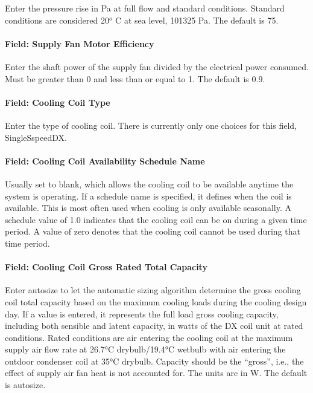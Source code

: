 Enter the pressure rise in Pa at full flow and standard conditions. Standard conditions are considered 20\(^{o}\) C at sea level, 101325 Pa. The default is 75.

\paragraph{Field: Supply Fan Motor Efficiency}\label{field-supply-fan-motor-efficiency-2}

Enter the shaft power of the supply fan divided by the electrical power consumed. Must be greater than 0 and less than or equal to 1. The default is 0.9.

\paragraph{Field: Cooling Coil Type}\label{field-cooling-coil-type-2}

Enter the type of cooling coil. There is currently only one choices for this field, SingleSspeedDX.

\paragraph{Field: Cooling Coil Availability Schedule Name}\label{field-cooling-coil-availability-schedule-name-2}

Usually set to blank, which allows the cooling coil to be available anytime the system is operating. If a schedule name is specified, it defines when the coil is available. This is most often used when cooling is only available seasonally. A schedule value of 1.0 indicates that the cooling coil can be on during a given time period. A value of zero denotes that the cooling coil cannot be used during that time period.

\paragraph{Field: Cooling Coil Gross Rated Total Capacity}\label{field-cooling-coil-gross-rated-total-capacity-1}

Enter autosize to let the automatic sizing algorithm determine the gross cooling coil total capacity based on the maximum cooling loads during the cooling design day. If a value is entered, it represents the full load gross cooling capacity, including both sensible and latent capacity, in watts of the DX coil unit at rated conditions. Rated conditions are air entering the cooling coil at the maximum supply air flow rate at 26.7°C drybulb/19.4°C wetbulb with air entering the outdoor condenser coil at 35°C drybulb. Capacity should be the ``gross'', i.e., the effect of supply air fan heat is not accounted for. The units are in W. The default is autosize.

